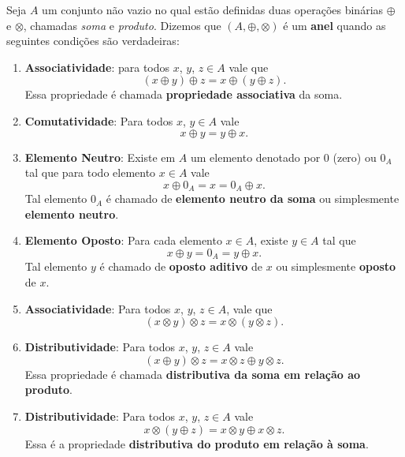 \begin{definicao}\label{definicaoanel}
    Seja $A$ um conjunto não vazio no qual estão definidas duas operações binárias $\oplus$ e $\otimes$, chamadas
    \textit{soma} e \textit{produto}.  Dizemos que $(A, \oplus, \otimes)$ é um \textbf{anel} quando as seguintes condições são verdadeiras:
    \begin{enumerate}[label={\roman*})] \item \textbf{Associatividade}: para todos $x$, $y$, $z \in A$ vale que \[ (x \oplus y) \oplus z = x \oplus (y \oplus z). \] Essa
    propriedade é chamada \textbf{propriedade associativa} da soma.\label{associatividadesoma}

        \item \textbf{Comutatividade}: Para todos $x$, $y \in A$ vale\label{comutatividadesoma}
        \[
            x \oplus y = y \oplus x.
        \]

        \item \textbf{Elemento Neutro}: Existe em $A$ um elemento denotado por $0$ (zero) ou $0_{A}$ tal que para todo elemento $x \in A$ vale
        \[
            x \oplus 0_A = x = 0_A \oplus x.
        \]
        Tal elemento $0_A$ é chamado de \textbf{elemento neutro da soma} ou simplesmente \textbf{elemento neutro}.

        \item \textbf{Elemento Oposto}: Para cada elemento $x \in A$, existe $y \in A$ tal que
        \[
            x \oplus y = 0_A = y \oplus x.
        \]
        Tal elemento $y$ é chamado de \textbf{oposto aditivo} de $x$ ou simplesmente \textbf{oposto} de $x$.

        \item \textbf{Associatividade}: Para todos $x$, $y$, $z \in A$, vale que\label{associatividadeproduto}
        \[
            (x\otimes y) \otimes z = x\otimes (y\otimes z).
        \]

        \item \textbf{Distributividade}: Para todos $x$, $y$, $z \in A$ vale
        \[
            (x \oplus y)\otimes z = x\otimes z \oplus y\otimes z.
        \]
        Essa propriedade é chamada \textbf{distributiva da soma em relação ao produto}.\label{distributividadesomaproduto}

        \item \textbf{Distributividade}: Para todos $x$, $y$, $z \in A$ vale
        \[
            x\otimes(y \oplus z) = x\otimes y \oplus x\otimes z.
        \]
        Essa é a propriedade \textbf{distributiva do produto em relação à soma}.\label{distributividadeprodutosoma}
    \end{enumerate}
\end{definicao}

